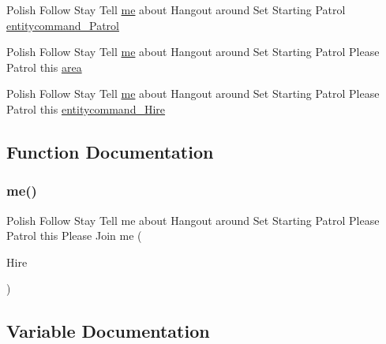 \begin{DoxyCompactItemize}
\item 
Polish Follow Stay Tell \mbox{\hyperlink{_blooms_01_animal_01_husbandry_2_config_2_localization_8txt_a290fbecf7c016b09bc675718400d6fca}{me}} about Hangout around Set Starting Patrol \mbox{\hyperlink{_blooms_01_animal_01_husbandry_2_config_2_localization_8txt_a7a2a1699b592866d82ea4ab3f0542dbc}{entitycommand\+\_\+\+Patrol}}
\item 
Polish Follow Stay Tell \mbox{\hyperlink{_blooms_01_animal_01_husbandry_2_config_2_localization_8txt_a290fbecf7c016b09bc675718400d6fca}{me}} about Hangout around Set Starting Patrol Please Patrol this \mbox{\hyperlink{_blooms_01_animal_01_husbandry_2_config_2_localization_8txt_a6b015b3c653b77c049df30c4a17aeaba}{area}}
\item 
Polish Follow Stay Tell \mbox{\hyperlink{_blooms_01_animal_01_husbandry_2_config_2_localization_8txt_a290fbecf7c016b09bc675718400d6fca}{me}} about Hangout around Set Starting Patrol Please Patrol this \mbox{\hyperlink{_blooms_01_animal_01_husbandry_2_config_2_localization_8txt_a57ff35422d68d8b614232e0f19a5f017}{entitycommand\+\_\+\+Hire}}
\end{DoxyCompactItemize}


\subsection{Function Documentation}
\mbox{\label{_blooms_01_animal_01_husbandry_2_config_2_localization_8txt_a290fbecf7c016b09bc675718400d6fca}} 
\subsubsection{\texorpdfstring{me()}{me()}}
{\footnotesize\ttfamily Polish Follow Stay Tell me about Hangout around Set Starting Patrol Please Patrol this Please Join me (\begin{DoxyParamCaption}\item[{Hire}]{ }\end{DoxyParamCaption})}



\subsection{Variable Documentation}
\mbox{\label{_blooms_01_animal_01_husbandry_2_config_2_localization_8txt_a6b015b3c653b77c049df30c4a17aeaba}} 

